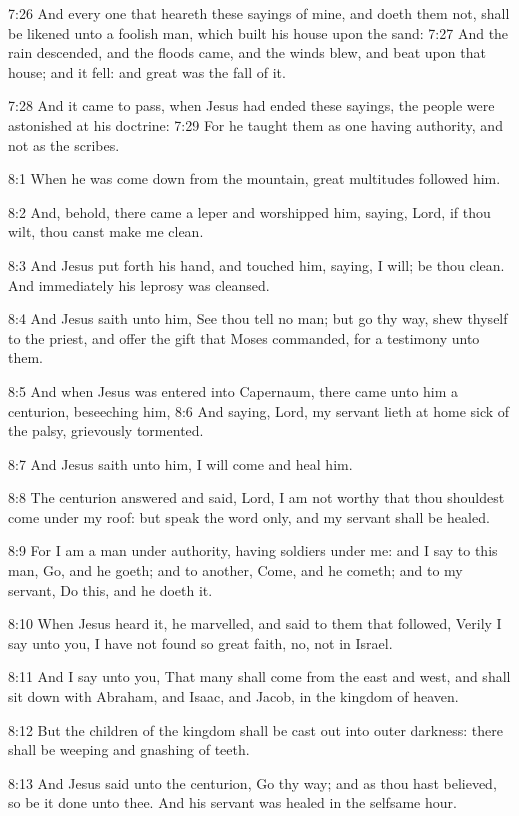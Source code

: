 7:26 And every one that heareth these sayings of mine, and doeth them
not, shall be likened unto a foolish man, which built his house upon
the sand: 7:27 And the rain descended, and the floods came, and the
winds blew, and beat upon that house; and it fell: and great was the
fall of it.

7:28 And it came to pass, when Jesus had ended these sayings, the
people were astonished at his doctrine: 7:29 For he taught them as one
having authority, and not as the scribes.

8:1 When he was come down from the mountain, great multitudes followed
him.

8:2 And, behold, there came a leper and worshipped him, saying, Lord,
if thou wilt, thou canst make me clean.

8:3 And Jesus put forth his hand, and touched him, saying, I will; be
thou clean. And immediately his leprosy was cleansed.

8:4 And Jesus saith unto him, See thou tell no man; but go thy way,
shew thyself to the priest, and offer the gift that Moses commanded,
for a testimony unto them.

8:5 And when Jesus was entered into Capernaum, there came unto him a
centurion, beseeching him, 8:6 And saying, Lord, my servant lieth at
home sick of the palsy, grievously tormented.

8:7 And Jesus saith unto him, I will come and heal him.

8:8 The centurion answered and said, Lord, I am not worthy that thou
shouldest come under my roof: but speak the word only, and my servant
shall be healed.

8:9 For I am a man under authority, having soldiers under me: and I
say to this man, Go, and he goeth; and to another, Come, and he
cometh; and to my servant, Do this, and he doeth it.

8:10 When Jesus heard it, he marvelled, and said to them that
followed, Verily I say unto you, I have not found so great faith, no,
not in Israel.

8:11 And I say unto you, That many shall come from the east and west,
and shall sit down with Abraham, and Isaac, and Jacob, in the kingdom
of heaven.

8:12 But the children of the kingdom shall be cast out into outer
darkness: there shall be weeping and gnashing of teeth.

8:13 And Jesus said unto the centurion, Go thy way; and as thou hast
believed, so be it done unto thee. And his servant was healed in the
selfsame hour.

